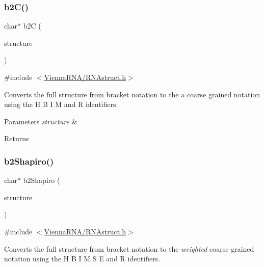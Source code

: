 \subsubsection{\texorpdfstring{b2\+C()}{b2C()}}
{\footnotesize\ttfamily char$\ast$ b2C (\begin{DoxyParamCaption}\item[{const char $\ast$}]{structure }\end{DoxyParamCaption})}



{\ttfamily \#include $<$\mbox{\hyperlink{_r_n_astruct_8h}{Vienna\+R\+N\+A/\+R\+N\+Astruct.\+h}}$>$}



Converts the full structure from bracket notation to the a coarse grained notation using the \textquotesingle{}H\textquotesingle{} \textquotesingle{}B\textquotesingle{} \textquotesingle{}I\textquotesingle{} \textquotesingle{}M\textquotesingle{} and \textquotesingle{}R\textquotesingle{} identifiers. 


\begin{DoxyParams}{Parameters}
{\em structure} & \\
\hline
\end{DoxyParams}
\begin{DoxyReturn}{Returns}

\end{DoxyReturn}
\mbox{\label{group__struct__utils_ga5cd2feb367feeacad0c03cb7ddba5f10}} 
\subsubsection{\texorpdfstring{b2\+Shapiro()}{b2Shapiro()}}
{\footnotesize\ttfamily char$\ast$ b2\+Shapiro (\begin{DoxyParamCaption}\item[{const char $\ast$}]{structure }\end{DoxyParamCaption})}



{\ttfamily \#include $<$\mbox{\hyperlink{_r_n_astruct_8h}{Vienna\+R\+N\+A/\+R\+N\+Astruct.\+h}}$>$}



Converts the full structure from bracket notation to the {\itshape weighted} coarse grained notation using the \textquotesingle{}H\textquotesingle{} \textquotesingle{}B\textquotesingle{} \textquotesingle{}I\textquotesingle{} \textquotesingle{}M\textquotesingle{} \textquotesingle{}S\textquotesingle{} \textquotesingle{}E\textquotesingle{} and \textquotesingle{}R\textquotesingle{} identifiers. 


